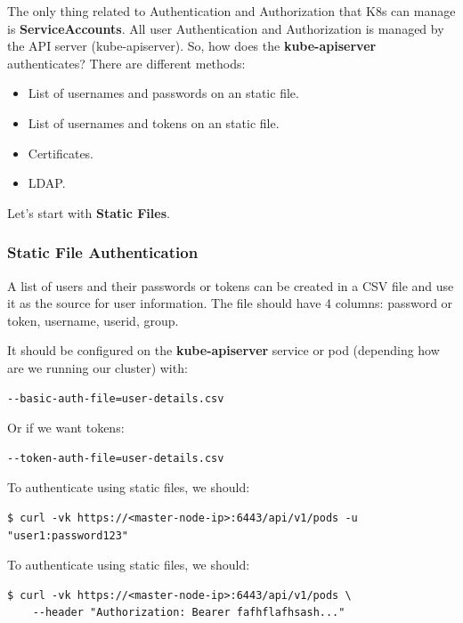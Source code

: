 \documentclass{article}
\newenvironment{codetemplate}[1][]{%
  \mybasecolorbox[#1]
  \itshape
}{%
  \endmybasecolorbox
}
\begin{document}
The only thing related to Authentication and Authorization that K8s can manage is \textbf{ServiceAccounts}. All user Authentication and Authorization is managed by the API server (kube-apiserver). So, how does the \textbf{kube-apiserver} authenticates? There are different methods:

\begin{itemize}
    \item List of usernames and passwords on an static file.
    \item List of usernames and tokens on an static file.
    \item Certificates.
    \item LDAP.
\end{itemize}

Let's start with \textbf{Static Files}.

\subsubsection{Static File Authentication}
A list of users and their passwords or tokens can be created in a CSV file and use it as the source for user information.
The file should have 4 columns: password or token, username, userid, group.

It should be configured on the \textbf{kube-apiserver} service or pod (depending how are we running our cluster) with:
\begin{codetemplate}{}
\begin{verbatim}
--basic-auth-file=user-details.csv
\end{verbatim}
\end{codetemplate}

Or if we want tokens:
\begin{codetemplate}{}
\begin{verbatim}
--token-auth-file=user-details.csv
\end{verbatim}
\end{codetemplate}

To authenticate using static files, we should:
\begin{codetemplate}{}
\begin{verbatim}
$ curl -vk https://<master-node-ip>:6443/api/v1/pods -u "user1:password123"
\end{verbatim}
\end{codetemplate}

To authenticate using static files, we should:
\begin{codetemplate}{}
\begin{verbatim}
$ curl -vk https://<master-node-ip>:6443/api/v1/pods \
    --header "Authorization: Bearer fafhflafhsash..."
\end{verbatim}
\end{codetemplate}
\end{document}
